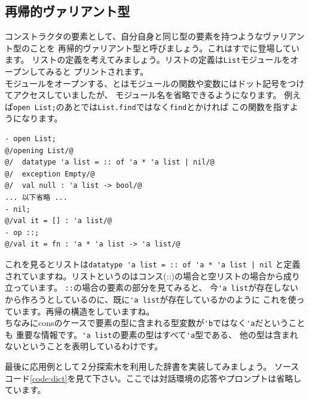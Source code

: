 \documentclass[11pt,a4paper]{article}
\begin{document}
\subsection{再帰的ヴァリアント型}

コンストラクタの要素として、自分自身と同じ型の要素を持つようなヴァリアント型のことを
再帰的ヴァリアント型と呼びましょう。これはすでに登場しています。
リストの定義を考えてみましょう。リストの定義は\lstinline{List}モジュールをオープンしてみると
プリントされます。\\
モジュールをオープンする、とはモジュールの関数や変数にはドット記号をつけてアクセスしていましたが、
モジュール名を省略できるようになります。
例えば\lstinline{open List;}のあとでは\lstinline{List.find}ではなく\lstinline{find}とかければ
この関数を指すようになります。

\begin{lstlisting}[caption=リストの定義を確認する,label=code:open-list]
- open List;
@/opening List/@
@/  datatype 'a list = :: of 'a * 'a list | nil/@
@/  exception Empty/@
@/  val null : 'a list -> bool/@
... 以下省略 ...
- nil;
@/val it = [] : 'a list/@
- op ::;
@/val it = fn : 'a * 'a list -> 'a list/@
\end{lstlisting}

これを見るとリストは\lstinline{datatype 'a list = :: of 'a * 'a list | nil}
と定義されていますね。リストというのはコンス(::)の場合と空リストの場合から成り立っています。
\lstinline{::}の場合の要素の部分を見てみると、
今\lstinline{'a list}が存在しないから作ろうとしているのに、既に\lstinline{'a list}が存在しているかのように
これを使っています。再帰の構造をしていますね。\\
ちなみにconsのケースで要素の型に含まれる型変数が\lstinline{'b}ではなく\lstinline{'a}だということも
重要な情報です。\lstinline{'a list}の要素の型はすべて\lstinline{'a}型である、
他の型は含まれないということを表明しているわけです。

最後に応用例として２分探索木を利用した辞書を実装してみましょう。
ソースコード\ref{code:dict}を見て下さい。ここでは対話環境の応答やプロンプトは省略しています。
\end{document}
